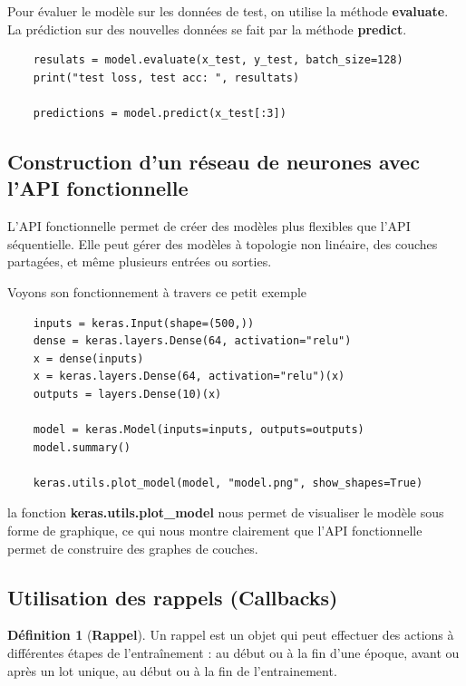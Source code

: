 \documentclass[a4paper,12pt,twoside]{report}
\theoremstyle{definition}
\newtheorem{defi}{Définition}
\theoremstyle{plain}
\theoremstyle{remark}
\begin{document}
Pour évaluer le modèle sur les données de test, on utilise la méthode \textbf{evaluate}. La prédiction sur des nouvelles données se fait par la méthode \textbf{predict}.

\begin{lstlisting}
	resulats = model.evaluate(x_test, y_test, batch_size=128)
	print("test loss, test acc: ", resultats)
	
	predictions = model.predict(x_test[:3])
\end{lstlisting}

\subsection{Construction d'un réseau de neurones avec l'API fonctionnelle}
L'API fonctionnelle permet de créer des modèles plus flexibles que l'API séquentielle. Elle peut gérer des modèles à topologie non linéaire, des couches partagées, et même plusieurs entrées ou sorties.

Voyons son fonctionnement à travers ce petit exemple

\begin{lstlisting}
	inputs = keras.Input(shape=(500,))
	dense = keras.layers.Dense(64, activation="relu")
	x = dense(inputs)
	x = keras.layers.Dense(64, activation="relu")(x)
	outputs = layers.Dense(10)(x)
	
	model = keras.Model(inputs=inputs, outputs=outputs)
	model.summary()
	
	keras.utils.plot_model(model, "model.png", show_shapes=True)
\end{lstlisting}

la fonction \textbf{keras.utils.plot\_model} nous permet de visualiser le modèle sous forme de graphique, ce qui nous montre clairement que l'API fonctionnelle permet de construire des graphes de couches.

\subsection{Utilisation des rappels (Callbacks)}

\begin{defi}[\textbf{Rappel}]
	Un rappel est un objet qui peut effectuer des actions à différentes étapes de l'entraînement : au début ou à la fin d'une époque, avant ou après un lot unique, au début ou à la fin de l'entrainement.
\end{defi}
\end{document}
